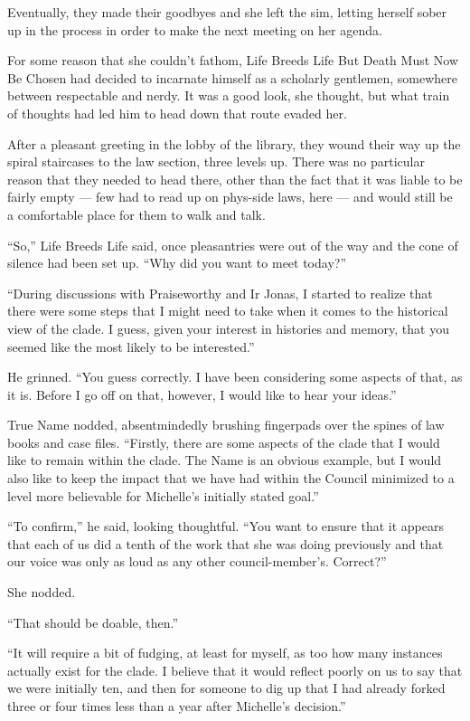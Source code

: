 Eventually, they made their goodbyes and she left the sim, letting herself sober up in the process in order to make the next meeting on her agenda.

For some reason that she couldn't fathom, Life Breeds Life But Death Must Now Be Chosen had decided to incarnate himself as a scholarly gentlemen, somewhere between respectable and nerdy. It was a good look, she thought, but what train of thoughts had led him to head down that route evaded her.

After a pleasant greeting in the lobby of the library, they wound their way up the spiral staircases to the law section, three levels up. There was no particular reason that they needed to head there, other than the fact that it was liable to be fairly empty — few had to read up on phys-side laws, here — and would still be a comfortable place for them to walk and talk.

``So,'' Life Breeds Life said, once pleasantries were out of the way and the cone of silence had been set up. ``Why did you want to meet today?''

``During discussions with Praiseworthy and Ir Jonas, I started to realize that there were some steps that I might need to take when it comes to the historical view of the clade. I guess, given your interest in histories and memory, that you seemed like the most likely to be interested.''

He grinned. ``You guess correctly. I have been considering some aspects of that, as it is. Before I go off on that, however, I would like to hear your ideas.''

True Name nodded, absentmindedly brushing fingerpads over the spines of law books and case files. ``Firstly, there are some aspects of the clade that I would like to remain within the clade. The Name is an obvious example, but I would also like to keep the impact that we have had within the Council minimized to a level more believable for Michelle's initially stated goal.''

``To confirm,'' he said, looking thoughtful. ``You want to ensure that it appears that each of us did a tenth of the work that she was doing previously and that our voice was only as loud as any other council-member's. Correct?''

She nodded.

``That should be doable, then.''

``It will require a bit of fudging, at least for myself, as too how many instances actually exist for the clade. I believe that it would reflect poorly on us to say that we were initially ten, and then for someone to dig up that I had already forked three or four times less than a year after Michelle's decision.''

